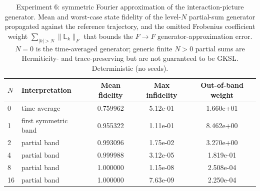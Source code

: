\begin{table}[ht]
\centering
\caption{Experiment 6: symmetric Fourier approximation of the interaction-picture generator. Mean and worst-case state fidelity of the level-$N$ partial-sum generator propagated against the reference trajectory, and the omitted Frobenius coefficient weight $\sum_{|k|>N}\lVert \mathbb L_k\rVert_F$ that bounds the $F\!\to\!F$ generator-approximation error. $N{=}0$ is the time-averaged generator; generic finite $N>0$ partial sums are Hermiticity- and trace-preserving but are not guaranteed to be GKSL. Deterministic (no seeds).}
\label{tab:exp6}
\begin{tabular}{llccc}
\toprule
$N$ & Interpretation & Mean fidelity & Max infidelity & Out-of-band weight \\
\midrule
0 & time average & 0.759962 & 5.12e-01 & 1.660e+01 \\
1 & first symmetric band & 0.955322 & 1.11e-01 & 8.462e+00 \\
2 & partial band & 0.993096 & 1.75e-02 & 3.270e+00 \\
4 & partial band & 0.999988 & 3.12e-05 & 1.819e-01 \\
8 & partial band & 1.000000 & 1.15e-08 & 2.508e-04 \\
16 & partial band & 1.000000 & 7.63e-09 & 2.250e-04 \\
\bottomrule
\end{tabular}
\end{table}
